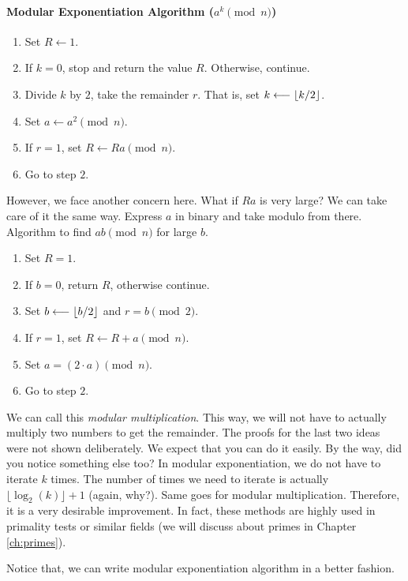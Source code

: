 \paragraph{Modular Exponentiation Algorithm ($a^k\pmod n$)}
	\begin{enumerate}[1.]
		\item Set $R \longleftarrow 1$.
		\item If $k=0$, stop and return the value $R$. Otherwise, continue.\label{alg:stopme}
		\item Divide $k$ by $2$, take the remainder $r$. That is, set $k\longleftarrow \left\lfloor{k/2}\right\rfloor$.
		\item Set $a\longleftarrow a^2\pmod n$.
		\item If $r=1$, set $R\longleftarrow Ra\pmod n$.
		\item Go to step $2$.
	\end{enumerate}
However, we face another concern here. What if $Ra$ is very large? We can take care of it the same way. Express $a$ in binary and take modulo from there. Algorithm to find $ab\pmod n$ for large $b$.
	\begin{enumerate}[1.]
		\item Set $R=1$.
		\item If $b=0$, return $R$, otherwise continue.
		\item Set $b\longleftarrow \left\lfloor{b/2}\right\rfloor$ and $r=b\pmod2$.
		\item If $r=1$, set $R\longleftarrow R+a\pmod n$.
		\item Set $a = (2\cdot a)\pmod n$.
		\item Go to step $2$.
	\end{enumerate}
We can call this \textit{modular multiplication}. This way, we will not have to actually multiply two numbers to get the remainder. The proofs for the last two ideas were not shown deliberately. We expect that you can do it easily. By the way, did you notice something else too? In modular exponentiation, we do not have to iterate $k$ times. The number of times we need to iterate is actually $\lfloor \log_2(k)\rfloor+1$ (again, why?). Same goes for modular multiplication. Therefore, it is a very desirable improvement. In fact, these methods are highly used in primality tests or similar fields (we will discuss about primes in Chapter \ref{ch:primes}).

Notice that, we can write modular exponentiation algorithm in a better fashion.
